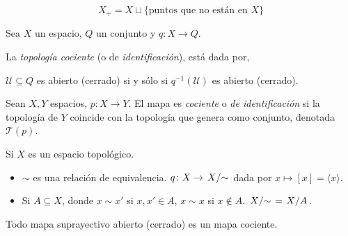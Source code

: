 \begin{tcolorbox}
    \[X_{+}=X\sqcup\{\text{puntos que no están en } X\}\]
\end{tcolorbox}

\begin{tcolorbox}[colback=blue-violet!5!white,colframe=blue-violet!75!black,title=\textbf{Definición}.]
    Sea \(X\) un espacio, \(Q\) un conjunto y \(q\colon X\to Q\).
    
    La \textit{topología cociente} (o de \textit{identificación}),  está dada por,
    
    \begin{center}
        \(\mathcal{U}\subseteq Q\) es abierto (cerrado) si y sólo si \(q^{-1}(\mathcal{U})\) es abierto (cerrado).
    \end{center}
\end{tcolorbox}

\begin{tcolorbox}[colback=blue-violet!5!white,colframe=blue-violet!75!black,title=\textbf{Definición}.]
    Sean \(X, Y\) espacios, \(p\colon X\to Y\). El mapa es \textit{cociente} o \textit{de identificación}
    si la topología de \(Y\) coincide con la topología que genera como conjunto, denotada \(\mathcal{T}(p)\).
\end{tcolorbox}

\begin{tcolorbox}[colback=lime!15!white,colframe=green!55!black,title=\textbf{Ejemplo}]
    Si \(X\) es un espacio topológico.
    \begin{itemize}[noitemsep, topsep=0pt]
        \item \(\sim\) es una relación de equivalencia. \(q\colon X \to \left.X\middle/\sim\right.\) dada por \(x\mapsto [x]=\langle x \rangle\).
        \item Si \(A\subseteq X\), donde \(x\sim x'\) si \(x, x'\in A\), \(x\sim x\) si \(x\notin A\). \(\left.X\middle/\sim\right.=\left.X\middle/A\right.\).
    \end{itemize}
\end{tcolorbox}

\begin{tcolorbox}[colback=lime!15!white,colframe=green!55!black,title=\textbf{Ejemplo}]
    Todo mapa suprayectivo abierto (cerrado) es un mapa cociente.
\end{tcolorbox}


